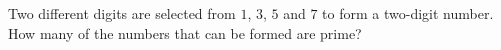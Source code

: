Two different digits are selected from $1$, $3$, $5$ and $7$ to form a two-digit number. How many of the numbers that can be formed are prime?
